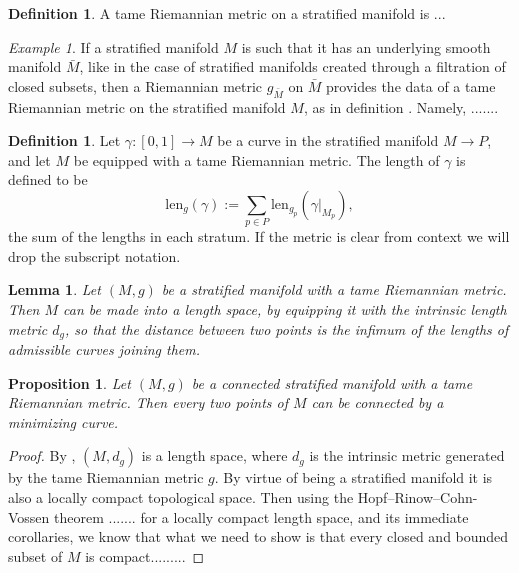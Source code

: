 \documentclass[12pt,a4paper]{article}
\newcounter{counter} \numberwithin{counter}{section}
\theoremstyle{definition}
\newtheorem{definition}[counter]{Definition}
\theoremstyle{plain}
\newtheorem{lemma}[counter]{Lemma}
\newtheorem{proposition}[counter]{Proposition}
\theoremstyle{remark}
\newtheorem{example}[counter]{Example}
\begin{document}
\begin{definition}\label{def:Riem_met_on_strat}
    A tame Riemannian metric on a stratified manifold is ... 
\end{definition}


\begin{example}
    If a stratified manifold $M$ is such that it has an underlying smooth manifold $\bar{M}$, like in the case of stratified manifolds created through a filtration of closed subsets, then a Riemannian metric $g_{\bar{M}}$ on $\bar{M}$ provides the data of a tame Riemannian metric on the stratified manifold $M$, as in definition . Namely, .......
\end{example}




\begin{definition}
    Let $\gamma: [0,1] \xrightarrow{} M$ be a curve in the stratified manifold $M \xrightarrow{} P$, and let $M$ be equipped with a tame Riemannian metric. The length of $\gamma$ is defined to be
    \begin{equation}
        \mathrm{len}_{g}(\gamma) := \sum_{p \in P} \mathrm{len}_{g_p} (\gamma|_{M_p}),
    \end{equation}
    the sum of the lengths in each stratum. If the metric is clear from context we will drop the subscript notation.
\end{definition}


\begin{lemma}\label{lem:length_space}
    Let $(M,g)$ be a stratified manifold with a tame Riemannian metric. Then $M$ can be made into a length space, by equipping it with the intrinsic length metric $d_g$, so that the distance between two points is the infimum of the lengths of admissible curves joining them.
\end{lemma}


\begin{proposition}
    Let $(M, g)$ be a connected stratified manifold with a tame Riemannian metric. Then every two points of $M$ can be connected by a minimizing curve.
\end{proposition}


\begin{proof}
    By , $(M,d_g)$ is a length space, where $d_g$ is the intrinsic metric generated by the tame Riemannian metric $g$. By virtue of being a stratified manifold it is also a locally compact topological space. Then using the Hopf--Rinow--Cohn-Vossen theorem ....... for a locally compact length space, and its immediate corollaries, we know that what we need to show is that every closed and bounded subset of $M$ is compact.........
\end{proof}
\end{document}

